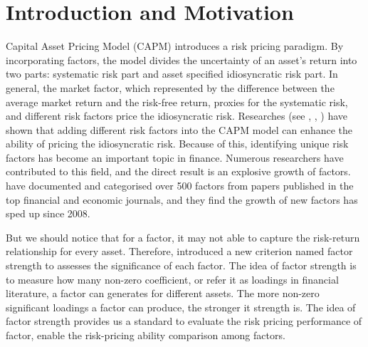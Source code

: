 


\section{Introduction and Motivation}
Capital Asset Pricing Model (CAPM) \cite{Sharpe1964, Lintner1965, Black1972} introduces a risk pricing paradigm.
By incorporating factors, the model divides the uncertainty of an asset's return into two parts: systematic risk part and asset specified idiosyncratic risk part.
In general, the market factor, which represented by the difference between the average market return and the risk-free return, proxies for the systematic risk, and different risk factors price the idiosyncratic risk.
Researches (see , , ) have shown that adding different risk factors into the CAPM model can enhance the ability of pricing the idiosyncratic risk.
Because of this, identifying unique risk factors has become an important topic in finance.
Numerous researchers have contributed to this field, and the direct result is an explosive growth of factors.
  have documented and categorised over 500 factors from papers published in the top financial and economic journals, and they find the growth of new factors has sped up since 2008. 
 
But we should notice that for a factor, it may not able to capture the risk-return relationship for every asset.
Therefore,  introduced a new criterion named factor strength to assesses the significance of each factor.
The idea of factor strength is to measure how many non-zero coefficient, or refer it as loadings in financial literature, a factor can generates for different assets.
The more non-zero significant loadings a factor can produce, the stronger it strength is.
The idea of factor strength provides us a standard to evaluate the risk pricing performance of factor, enable the risk-pricing ability comparison among factors.

